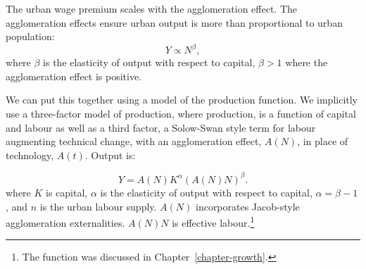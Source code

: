 The urban wage premium scales with the agglomeration effect. The \glspl{agglomeration effect} ensure urban \gls{output} is more than proportional to urban population: 
 \begin{equation}
 Y\propto N^{\beta},
 \label{eqn-production-population}
 \end{equation}
where $\beta$ is the elasticity of output with respect to capital, $\beta > 1$ where the agglomeration effect is positive. %

We can put this together using a model of the production function. We implicitly use a three-factor model of \gls{production}, where production, is a function of capital and labour as well as a third factor, a Solow-Swan style term for labour augmenting technical change, with an \gls{agglomeration} effect, $A(N)$, in place of technology, $A(t)$. Output is:

\begin{equation}
Y=A(N)K^{\alpha }(A(N)N)^\beta.
\label{eqn-prod1}
\end{equation}
where $K$ is capital, $\alpha$ is the elasticity of output with respect to capital, $\alpha = \beta - 1$, and  $n$ is the \gls{urban labour supply}. $A(N)$ incorporates Jacob-style agglomeration externalities. $A(N)N$ is \gls{effective labour}.\footnote{The function  was discussed in Chapter~\ref{chapter-growth}.}



 
